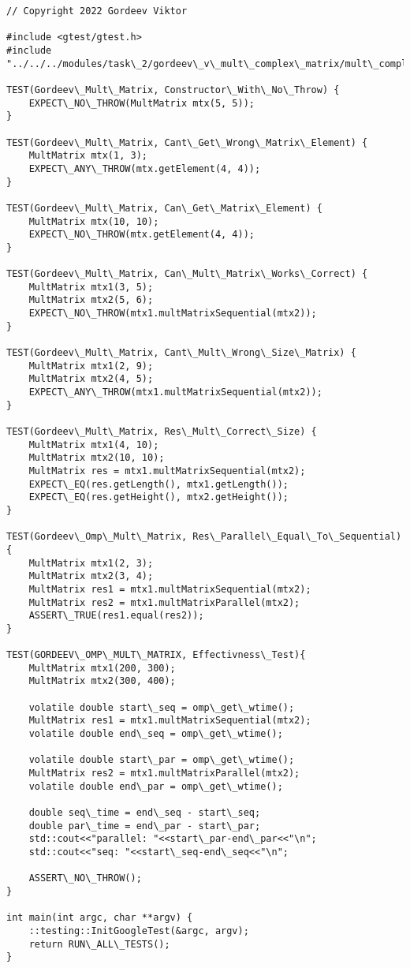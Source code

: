 \documentclass{report}
\begin{document}
\begin{lstlisting}
// Copyright 2022 Gordeev Viktor

#include <gtest/gtest.h>
#include "../../../modules/task\_2/gordeev\_v\_mult\_complex\_matrix/mult\_complex\_matrix.h"

TEST(Gordeev\_Mult\_Matrix, Constructor\_With\_No\_Throw) {
    EXPECT\_NO\_THROW(MultMatrix mtx(5, 5));
}

TEST(Gordeev\_Mult\_Matrix, Cant\_Get\_Wrong\_Matrix\_Element) {
    MultMatrix mtx(1, 3);
    EXPECT\_ANY\_THROW(mtx.getElement(4, 4));
}

TEST(Gordeev\_Mult\_Matrix, Can\_Get\_Matrix\_Element) {
    MultMatrix mtx(10, 10);
    EXPECT\_NO\_THROW(mtx.getElement(4, 4));
}

TEST(Gordeev\_Mult\_Matrix, Can\_Mult\_Matrix\_Works\_Correct) {
    MultMatrix mtx1(3, 5);
    MultMatrix mtx2(5, 6);
    EXPECT\_NO\_THROW(mtx1.multMatrixSequential(mtx2));
}

TEST(Gordeev\_Mult\_Matrix, Cant\_Mult\_Wrong\_Size\_Matrix) {
    MultMatrix mtx1(2, 9);
    MultMatrix mtx2(4, 5);
    EXPECT\_ANY\_THROW(mtx1.multMatrixSequential(mtx2));
}

TEST(Gordeev\_Mult\_Matrix, Res\_Mult\_Correct\_Size) {
    MultMatrix mtx1(4, 10);
    MultMatrix mtx2(10, 10);
    MultMatrix res = mtx1.multMatrixSequential(mtx2);
    EXPECT\_EQ(res.getLength(), mtx1.getLength());
    EXPECT\_EQ(res.getHeight(), mtx2.getHeight());
}

TEST(Gordeev\_Omp\_Mult\_Matrix, Res\_Parallel\_Equal\_To\_Sequential) {
    MultMatrix mtx1(2, 3);
    MultMatrix mtx2(3, 4);
    MultMatrix res1 = mtx1.multMatrixSequential(mtx2);
    MultMatrix res2 = mtx1.multMatrixParallel(mtx2);
    ASSERT\_TRUE(res1.equal(res2));
}

TEST(GORDEEV\_OMP\_MULT\_MATRIX, Effectivness\_Test){
    MultMatrix mtx1(200, 300);
    MultMatrix mtx2(300, 400);

    volatile double start\_seq = omp\_get\_wtime();
    MultMatrix res1 = mtx1.multMatrixSequential(mtx2);
    volatile double end\_seq = omp\_get\_wtime();

    volatile double start\_par = omp\_get\_wtime();
    MultMatrix res2 = mtx1.multMatrixParallel(mtx2);
    volatile double end\_par = omp\_get\_wtime();

    double seq\_time = end\_seq - start\_seq;
    double par\_time = end\_par - start\_par;
    std::cout<<"parallel: "<<start\_par-end\_par<<"\n";
    std::cout<<"seq: "<<start\_seq-end\_seq<<"\n";

    ASSERT\_NO\_THROW();
}

int main(int argc, char **argv) {
    ::testing::InitGoogleTest(&argc, argv);
    return RUN\_ALL\_TESTS();
}


\end{lstlisting}
\end{document}

